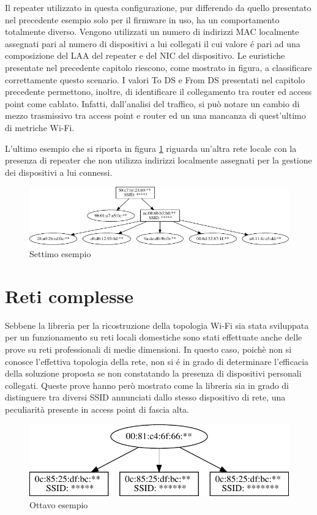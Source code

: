 Il repeater utilizzato in questa configurazione, pur differendo da quello presentato nel precedente esempio solo per il firmware in uso, ha un comportamento totalmente diverso.
Vengono utilizzati un numero di indirizzi MAC localmente assegnati pari al numero di dispositivi a lui collegati il cui valore \'e pari ad una composizione del LAA del repeater e del NIC del dispositivo.
Le euristiche presentate nel precedente capitolo riescono, come mostrato in figura, a classificare correttamente questo scenario.
I valori To DS e From DS presentati nel capitolo precedente permettono, inoltre, di identificare il collegamento tra router ed access point come cablato.
Infatti, dall'analisi del traffico, si pu\`o notare un cambio di mezzo trasmissivo tra access point e router ed un una mancanza di quest'ultimo di metriche Wi-Fi.

L'ultimo esempio che si riporta in figura \ref{fig:es7} riguarda un'altra rete locale con la presenza di repeater che non utilizza indirizzi localmente assegnati per la gestione dei dispositivi a lui connessi.
  
\begin{figure}[!h]
	\centering
	\includegraphics{images/img14censored.pdf}
	\caption{Settimo esempio}
	\label{fig:es7}
\end{figure}

\section{Reti complesse}
Sebbene la libreria per la ricostruzione della topologia Wi-Fi sia stata sviluppata per un funzionamento su reti locali domestiche sono stati effettuate anche delle prove su reti professionali di medie dimensioni.
In questo caso, poich\`e non si conosce l'effettiva topologia della rete, non si \'e in grado di determinare l'efficacia della soluzione proposta se non constatando la presenza di dispositivi personali collegati.
Queste prove hanno per\`o mostrato come la libreria sia in grado di distinguere tra diversi SSID annunciati dallo stesso dispositivo di rete, una peculiarit\`a presente in access point di fascia alta.


\begin{figure}[!h]
	\centering
	\includegraphics{images/img15censored.pdf}
	\caption{Ottavo esempio}
	\label{fig:es8}
\end{figure}

